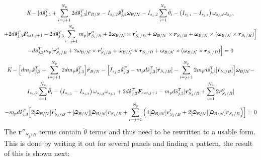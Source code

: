 \documentclass[paper]{aiaaNew}
\begin{document}
\begin{multline}
\textit{K} - [d\bm{\hat{s}}^{T}_{j,3}+\sum^{N_p}_{i=j+1}2d\bm{\hat{s}}^{T}_{j,3}]\ddot{\bm r}_{B/N} - I_{s_j,2} \bm{\hat{s}}_{j,2}^T \dot{\bm\omega}_{\cal B/N} - I_{s_j,2} \sum^{N_p}_{i=1}\ddot{\theta}_i - \left( I_{s_{j,1}} - I_{s_{j,3}}\right) \omega_{s_{j,3}} \omega_{s_{j,1}}\\
+ 2d\bm{\hat{s}}^{T}_{j,3}\bm F_{ext,j+1} - 2d\bm{\hat{s}}^{T}_{j,3}\sum^{N_p}_{i=j+1}m_{\text{p}} [\bm r''_{S_{i}/B}+ 2 \bm\omega_{\cal B/N} \times \bm{r}'_{S_i/B} + \dot{\bm\omega}_{\cal B/N} \times \bm{r}_{S_i/B}
+ \bm\omega_{\cal B/N} \times (\bm\omega_{\cal B/N} \times \bm{r}_{S_i/B})\Big] \\ - d\bm{\hat{s}}^{T}_{j,3} m_{\text{p}} [\bm r''_{S_{j}/B}+ 2 \bm\omega_{\cal B/N} \times \bm{r}'_{S_j/B} + \dot{\bm\omega}_{\cal B/N} \times \bm{r}_{S_j/B}
+ \bm\omega_{\cal B/N} \times (\bm\omega_{\cal B/N} \times \bm{r}_{S_j/B})\Big] = 0 %
\end{multline}
\begin{multline}
\textit{K} - \Big[d m_p\bm{\hat{s}}^{T}_{j,3}+\sum^{N_p}_{i=j+1}2 d m_p\bm{\hat{s}}^{T}_{j,3}\Big]\ddot{\bm r}_{B/N} - \Big[I_{s_j,2} \bm{\hat{s}}_{j,2}^T -m_p d \hat{s}^{T}_{j,3}[\tilde{{\bm r}}_{S_{i}/B}]-\sum^{N_p}_{i=j+1} 2 m_p d \hat{s}^{T}_{j,3}[\tilde{{\bm r}}_{S_{i}/B}]\Big]\dot{\bm\omega}_{\cal B/N} - \\
I_{s_j,2} \sum^{N_p}_{i=1}\ddot{\theta}_i - \left( I_{s_{j,1}} - I_{s_{j,3}}\right) \omega_{s_{j,3}} \omega_{s_{j,1}}+ 2d\bm{\hat{s}}^{T}_{j,3}\bm F_{ext,j+1}
-m_p d \hat{s}^{T}_{j,3}[\bm r''_{S_{j}/B} + \sum^{N_p}_{i=1} 2 \bm r''_{S_{i}/B}]\\
-m_p d \hat{s}^{T}_{j,3}\Big[2[\bm{\tilde{\omega}}_{\cal B/N}]\bm r'_{S_{j}/B} + [\bm{\tilde{\omega}}_{\cal B/N}][\bm{\tilde{\omega}}_{\cal B/N}]\bm r_{S_{j}/B}+\sum^{N_p}_{i=j+1}\Big(4[\bm{\tilde{\omega}}_{\cal B/N}]\bm r'_{S_{j}/B} + 2[\bm{\tilde{\omega}}_{\cal B/N}][\bm{\tilde{\omega}}_{\cal B/N}]\bm r_{S_{j}/B} \Big)\Big] = 0 
\end{multline}
The $\bm r''_{S_{j}/B}$ terms contain $\ddot{\theta}$ terms and thus need to be rewritten to a usable form. This is done by writing it out for several panels and finding a pattern, the result of this is shown next:
\end{document}
